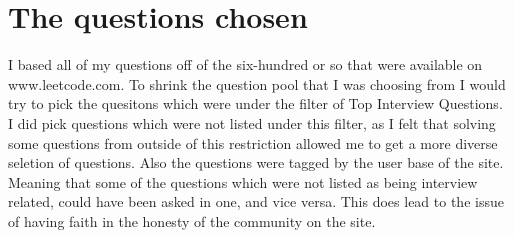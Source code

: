 \documentclass[10pt,twocolumn]{IEEEtran}
\begin{document}
%
%
 
 

\section{The questions chosen}
I based all of my questions off of the six-hundred or so that were available on www.leetcode.com\cite{leet1}. To shrink the question pool that I was choosing from I would try to pick the quesitons which were under the filter of Top Interview Questions. I did pick questions which were not listed under this filter, as I felt that solving some questions from outside of this restriction allowed me to get a more diverse seletion of questions. Also the questions were tagged by the user base of the site. Meaning that some of the questions which were not listed as being interview related, could have been asked in one, and vice versa. This does lead to the issue of having faith in the honesty of the community on the site.  
\end{document}
